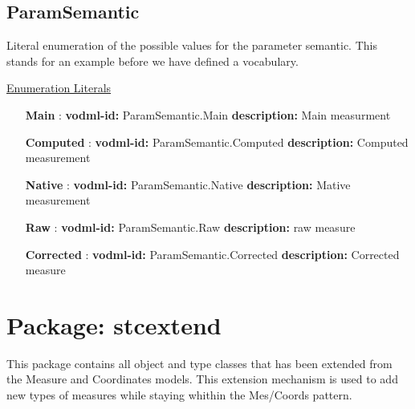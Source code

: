   \subsection{ParamSemantic}
  \label{sect:ParamSemantic}

  Literal enumeration of the possible values for the parameter semantic. This stands for an example before we have defined a vocabulary.

  \noindent \underline{Enumeration Literals}
  \vspace{-\parsep}
  \small
  \begin{itemize}
  
    \item[\textbf{Main}]: \textbf{vodml-id:} ParamSemantic.Main \newline
          \textbf{description:} Main measurment
    \item[\textbf{Computed}]: \textbf{vodml-id:} ParamSemantic.Computed \newline
          \textbf{description:} Computed measurement
    \item[\textbf{Native}]: \textbf{vodml-id:} ParamSemantic.Native \newline
          \textbf{description:} Mative measurement
    \item[\textbf{Raw}]: \textbf{vodml-id:} ParamSemantic.Raw \newline
          \textbf{description:} raw measure
    \item[\textbf{Corrected}]: \textbf{vodml-id:} ParamSemantic.Corrected \newline
          \textbf{description:} Corrected measure
  \end{itemize}
  \normalsize


\pagebreak
\section{Package: stcextend }


  This package contains all object and type classes that has been extended from the Measure and Coordinates models. This extension mechanism is used to add new types of measures while staying whithin the Mes/Coords pattern.

